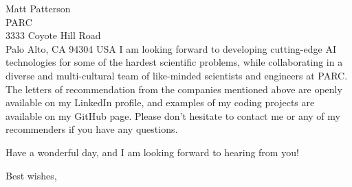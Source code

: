 \begin{letter}{%
  	Matt Patterson \\
    PARC \\
    3333 Coyote Hill Road \\
	Palo Alto, CA 94304 USA
    }
I am looking forward to developing cutting-edge AI technologies for some of the hardest scientific problems, while collaborating in a diverse and multi-cultural team of like-minded scientists and engineers at PARC. The letters of recommendation from the companies mentioned above are openly available on my LinkedIn profile, and examples of my coding projects are available on my GitHub page. Please don't hesitate to contact me or any of my recommenders if you have any questions. 

Have a wonderful day, and I am looking forward to hearing from you!

    
	
    \closing{Best wishes,}
    
    
    
    
    
    
    \end{letter}




